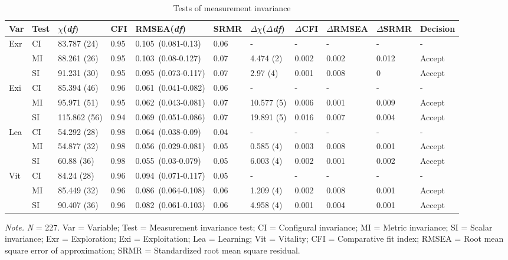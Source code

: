 \documentclass[man, 12pt, a4paper, noextraspace]{apa6}
\begin{document}
\begin{table}
\caption{Tests of measurement invariance}
\centering

\begin{tabular}{p{1.0cm}p{1.0cm}p{2.2cm}p{1cm}p{3.7cm}p{1cm}p{2cm}p{1.7cm}p{1.7cm}p{1.7cm}p{2cm}}
  \toprule
Var & Test & $\chi$(\textit{df}) & CFI & RMSEA(\textit{df}) & SRMR & $\Delta\chi$($\Delta$\textit{df}) & $\Delta$CFI & $\Delta$RMSEA & $\Delta$SRMR & Decision \\ 
  \midrule
Exr & CI & 83.787 (24) & 0.95 & 0.105\ (0.081-0.13) & 0.06 & - & - & - & - & - \\ 
   & MI & 88.261 (26) & 0.95 & 0.103\ (0.08-0.127) & 0.07 & 4.474 (2) & 0.002 & 0.002 & 0.012 & Accept \\ 
   & SI & 91.231 (30) & 0.95 & 0.095\ (0.073-0.117) & 0.07 & 2.97 (4) & 0.001 & 0.008 & 0 & Accept \\ 
  Exi & CI & 85.394 (46) & 0.96 & 0.061\ (0.041-0.082) & 0.06 & - & - & - & - & - \\ 
   & MI & 95.971 (51) & 0.95 & 0.062\ (0.043-0.081) & 0.07 & 10.577 (5) & 0.006 & 0.001 & 0.009 & Accept \\ 
   & SI & 115.862 (56) & 0.94 & 0.069\ (0.051-0.086) & 0.07 & 19.891 (5) & 0.016 & 0.007 & 0.004 & Accept \\ 
  Lea & CI & 54.292 (28) & 0.98 & 0.064\ (0.038-0.09) & 0.04 & - & - & - & - & - \\ 
   & MI & 54.877 (32) & 0.98 & 0.056\ (0.029-0.081) & 0.05 & 0.585 (4) & 0.003 & 0.008 & 0.001 & Accept \\ 
   & SI & 60.88 (36) & 0.98 & 0.055\ (0.03-0.079) & 0.05 & 6.003 (4) & 0.002 & 0.001 & 0.002 & Accept \\ 
  Vit & CI & 84.24 (28) & 0.96 & 0.094\ (0.071-0.117) & 0.05 & - & - & - & - & - \\ 
   & MI & 85.449 (32) & 0.96 & 0.086\ (0.064-0.108) & 0.06 & 1.209 (4) & 0.002 & 0.008 & 0.001 & Accept \\ 
   & SI & 90.407 (36) & 0.96 & 0.082\ (0.061-0.103) & 0.06 & 4.958 (4) & 0.001 & 0.004 & 0.001 & Accept \\  
   \bottomrule
\end{tabular}
\smallskip
\begin{tablenotes}
{\small
\textit{Note.} \textit{N} = 227. Var = Variable; Test = Measurement invariance test; CI = Configural invariance; MI = Metric invariance; SI = Scalar invariance; Exr = Exploration; Exi = Exploitation; Lea = Learning; Vit = Vitality; CFI = Comparative fit index; RMSEA = Root mean square error of approximation; SRMR = Standardized root mean square residual.
}
\end{tablenotes}
\end{table}
\end{document}
